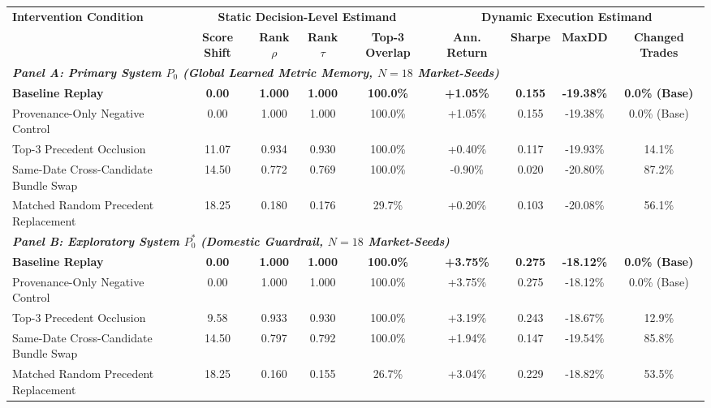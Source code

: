 \begin{table}[t]
\centering
\small
\begin{tabular}{lcccccccc}
\toprule
\textbf{Intervention Condition} & \multicolumn{4}{c}{\textbf{Static Decision-Level Estimand}} & \multicolumn{4}{c}{\textbf{Dynamic Execution Estimand}} \\
\cmidrule(lr){2-5} \cmidrule(lr){6-9}
& \textbf{Score Shift} & \textbf{Rank $\rho$} & \textbf{Rank $\tau$} & \textbf{Top-3 Overlap} & \textbf{Ann. Return} & \textbf{Sharpe} & \textbf{MaxDD} & \textbf{Changed Trades} \\
\midrule
\multicolumn{9}{l}{\textit{\textbf{Panel A: Primary System $P_0$ (Global Learned Metric Memory, $N=18$ Market-Seeds)}}} \\
\midrule
\textbf{Baseline Replay} & \textbf{0.00} & \textbf{1.000} & \textbf{1.000} & \textbf{100.0\%} & \textbf{+1.05\%} & \textbf{0.155} & \textbf{-19.38\%} & \textbf{0.0\% (Base)} \\
Provenance-Only Negative Control & 0.00 & 1.000 & 1.000 & 100.0\% & +1.05\% & 0.155 & -19.38\% & 0.0\% (Base) \\
Top-3 Precedent Occlusion & 11.07 & 0.934 & 0.930 & 100.0\% & +0.40\% & 0.117 & -19.93\% & 14.1\% \\
Same-Date Cross-Candidate Bundle Swap & 14.50 & 0.772 & 0.769 & 100.0\% & -0.90\% & 0.020 & -20.80\% & 87.2\% \\
Matched Random Precedent Replacement & 18.25 & 0.180 & 0.176 & 29.7\% & +0.20\% & 0.103 & -20.08\% & 56.1\% \\
\midrule
\multicolumn{9}{l}{\textit{\textbf{Panel B: Exploratory System $P_0^*$ (Domestic Guardrail, $N=18$ Market-Seeds)}}} \\
\midrule
\textbf{Baseline Replay} & \textbf{0.00} & \textbf{1.000} & \textbf{1.000} & \textbf{100.0\%} & \textbf{+3.75\%} & \textbf{0.275} & \textbf{-18.12\%} & \textbf{0.0\% (Base)} \\
Provenance-Only Negative Control & 0.00 & 1.000 & 1.000 & 100.0\% & +3.75\% & 0.275 & -18.12\% & 0.0\% (Base) \\
Top-3 Precedent Occlusion & 9.58 & 0.933 & 0.930 & 100.0\% & +3.19\% & 0.243 & -18.67\% & 12.9\% \\
Same-Date Cross-Candidate Bundle Swap & 14.50 & 0.797 & 0.792 & 100.0\% & +1.94\% & 0.147 & -19.54\% & 85.8\% \\
Matched Random Precedent Replacement & 18.25 & 0.160 & 0.155 & 26.7\% & +3.04\% & 0.229 & -18.82\% & 53.5\% \\
\bottomrule

\end{tabular}
\end{table}
